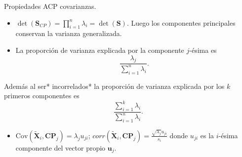 \documentclass[
  ignorenonframetext,
]{beamer}
\providecommand{\tightlist}{%
  \setlength{\itemsep}{0pt}\setlength{\parskip}{0pt}}
\begin{document}
\begin{frame}{Propiedades ACP covarianzas.}
\label{propiedades-acp-covarianzas.-3}
\begin{itemize}
\item
  \(\det(\mathbf{S}_{CP})=\prod_{i=1}^n \lambda_i =\det(\mathbf{S})\).
  Luego los componentes principales conservan la varianza generalizada.
\item
  La proporción de varianza explicada por la componente \(j\)-ésima es
  \[\frac{\lambda_j}{\sum_{i=1}^n \lambda_i}.\]
\end{itemize}

Además al ser* incorrelados* la proporción de varianza explicada por los
\(k\) primeros componentes es \[\frac{\sum_{i=1}^k
\lambda_i}{\sum_{i=1}^n \lambda_i}.\]

\begin{itemize}
\tightlist
\item
  \(\mbox{Cov}(\tilde{\mathbf{X}}_i, \mathbf{CP}_j)=\lambda_j u_{j i}\);
  \(corr(\tilde{\mathbf{X}}_i, \mathbf{CP}_j)=\frac{\sqrt{\lambda_j} u_{j i}}{s_i}\)
  donde \(u_{j i}\) es la \(i\)-ésima componente del vector propio
  \(\mathbf{u}_j\).
\end{itemize}
\end{frame}
\end{document}
